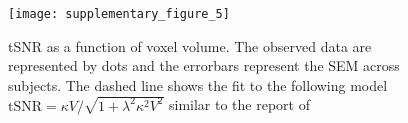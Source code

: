 \begin{figure} \centering
  \texttt{[image: supplementary\_figure\_5]}
  \caption{
	tSNR as a function of voxel volume. The observed data are represented by dots
    and the errorbars represent the SEM across subjects. The dashed line shows the fit
    to the following model $\text{tSNR}=\kappa  V / \sqrt{1+\lambda^2  \kappa^2  V^2}$ 
    similar to the report of \citet{triantafyllou_2005}
  }
  \label{fig:tSNR_vs_resolution}
\end{figure}

